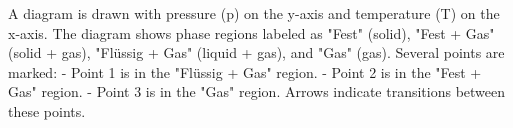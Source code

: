 A diagram is drawn with pressure (p) on the y-axis and temperature (T) on the x-axis. The diagram shows phase regions labeled as "Fest" (solid), "Fest + Gas" (solid + gas), "Flüssig + Gas" (liquid + gas), and "Gas" (gas).  
Several points are marked:  
- Point 1 is in the "Flüssig + Gas" region.  
- Point 2 is in the "Fest + Gas" region.  
- Point 3 is in the "Gas" region.  
Arrows indicate transitions between these points.